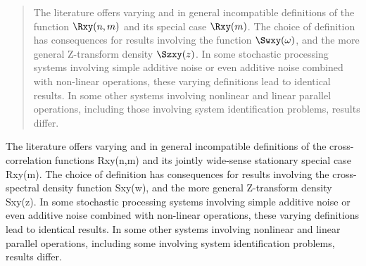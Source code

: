 \begin{abstract}
The literature offers varying and in general incompatible definitions of the
 function $\Rxy(n,m)$ and its  special case $\Rxy(m)$.
The choice of definition has consequences for results involving the  function 
$\Swxy(\omega)$, and the more general Z-transform density $\Szxy(z)$.
In some stochastic processing systems involving simple additive noise or even additive noise
combined with non-linear operations, these varying definitions lead to identical results.
In some other systems involving nonlinear and linear parallel operations, 
including those involving system identification problems,
results differ.
\end{abstract}

The literature offers varying and in general incompatible definitions of the cross-correlation functions Rxy(n,m) and its jointly wide-sense stationary special case Rxy(m). The choice of definition has consequences for results involving the cross-spectral density function Sxy(w), and the more general Z-transform density Sxy(z). In some stochastic processing systems involving simple additive noise or even additive noise combined with non-linear operations, these varying definitions lead to identical results. In some other systems involving nonlinear and linear parallel operations, including some involving system identification problems, results differ.
%

